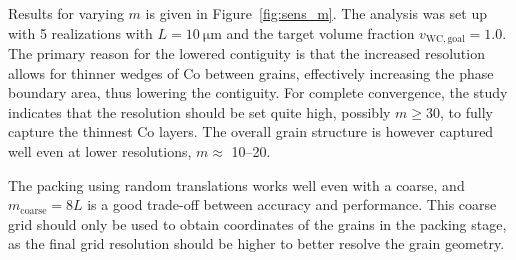 \documentclass[3p,12pt]{elsarticle}
\newcommand{\WC}{\mathrm{WC}}
\begin{document}
Results for varying $m$ is given in Figure~\ref{fig:sens_m}.
The analysis was set up with 5 realizations with $L = \SI{10}{\micro\meter}$ and the target volume fraction $v_{\WC,\text{goal}} = 1.0$.
The primary reason for the lowered contiguity is that the increased resolution allows for thinner wedges of Co between grains, effectively increasing the phase boundary area, thus lowering the contiguity.
For complete convergence, the study indicates that the resolution should be set quite high, possibly $m \geq 30$, to fully capture the thinnest Co layers.
The overall grain structure is however captured well even at lower resolutions, $m \approx $ 10--20.

The packing using random translations works well even with a coarse, and $m_\text{coarse} = 8 L$ is a good trade-off between accuracy and performance.
This coarse grid should only be used to obtain coordinates of the grains in the packing stage, as the final grid resolution should be higher to better resolve the grain geometry.
\end{document}
